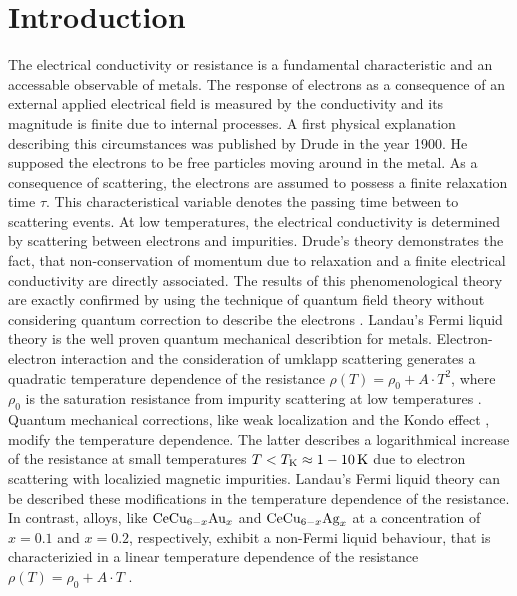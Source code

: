 %
%
\chapter{Introduction}
\label{ch:introduction}
%
%
The electrical conductivity or resistance is a fundamental characteristic and an accessable observable of metals.
The response of electrons as a consequence of an external applied electrical field is measured by the conductivity and its magnitude is finite due to internal processes.
A first physical explanation describing this circumstances was published by Drude \cite{Drude} in the year 1900.
He supposed the electrons to be free particles moving around in the metal.
As a consequence of scattering, the electrons are assumed to possess a finite relaxation time $\tau$.
This characteristical variable denotes the passing time between to scattering events.
At low temperatures, the electrical conductivity is determined by scattering between electrons and impurities.
Drude's theory demonstrates the fact, that non-conservation of momentum due to relaxation and a finite electrical conductivity are directly associated.
The results of this phenomenological theory are exactly confirmed by using the technique of quantum field theory without considering quantum correction to describe the electrons \cite{Bruus&Flensberg}.
Landau's Fermi liquid theory is the well proven quantum mechanical describtion for metals.
Electron-electron interaction and the consideration of umklapp scattering generates a quadratic temperature dependence of the resistance $\rho(T) = \rho_{0} + A \cdot T^{2}$, where $\rho_{0}$ is the saturation resistance from impurity scattering at low temperatures \cite{Bader,Pal}.
Quantum mechanical corrections, like weak localization \cite{Altshuler} and the Kondo effect \cite{Kondo}, modify the temperature dependence.
The latter describes a logarithmical increase of the resistance at small temperatures $T < T_{\mathrm{K}} \approx 1-10\,\mathrm{K}$ \cite{Kouwenhoven&Glazman} due to electron scattering with localizied magnetic impurities.
Landau's Fermi liquid theory can be described these modifications in the temperature dependence of the resistance.
In contrast, alloys, like $\mathrm{CeCu}_{6-x}\mathrm{Au}_{x}$ and $\mathrm{CeCu}_{6-x}\mathrm{Ag}_{x}$ at a concentration of $x=0.1$ and $x=0.2$, respectively, exhibit a non-Fermi liquid behaviour, that is characterizied in a linear temperature dependence of the resistance $\rho(T) = \rho_{0} + A \cdot T$ \cite{Loehneysen}. 

